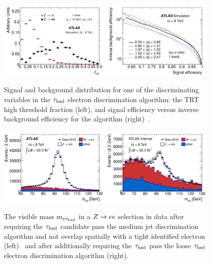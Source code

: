 \begin{figure}[tp]
  \centering
  \includegraphics[width=0.48\textwidth]{figures/PERF-2013-06/fig_08a}
  \includegraphics[width=0.48\textwidth]{figures/PERF-2013-06/fig_09}
  \caption{Signal and background distribution for one of the discriminating variables in the $\tau_\text{had}$ electron discrimination algorithm: the TRT high threshold fraction (left), and signal efficiency versus inverse background efficiency for the algorithm (right)~\cite{PERF-2013-06}.}
  \label{fig:taus-electronfakes1}
\end{figure}

\begin{figure}[tp]
  \centering
  \includegraphics[width=0.48\textwidth]{figures/PERF-2013-06/fig_14a}
  \includegraphics[width=0.48\textwidth]{figures/PERF-2013-06/eveto_mvis_mediumID_loosePPOLR_looseeveto}
  \caption{The visible mass $m_{e\tau_\text{had}}$ in a $Z \rightarrow ee$ selection in data after requiring the $\tau_\text{had}$ candidate pass the medium jet discrimination algorithm and not overlap spatially with a tight identified electron (left)~\cite{PERF-2013-06} and after additionally requiring the $\tau_\text{had}$ pass the loose $\tau_\text{had}$ electron discrimination algorithm (right).}
  \label{fig:taus-electronfakes2}
\end{figure}

